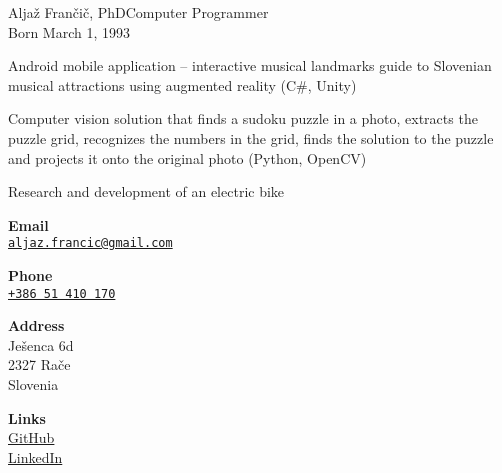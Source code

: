 \documentclass{article}
\begin{document}
\begin{cv}[avatar]{Aljaž Frančič, PhD}{Computer Programmer\\\small{Born March 1, 1993}}
\begin{cvevent}
\end{cvevent}

\cvseparator[2]
\begin{cvevent}
    Android mobile application – interactive musical landmarks guide to Slovenian musical attractions using augmented reality (C\#, Unity)
\end{cvevent}

\cvseparator[2]
\begin{cvevent}
   Computer vision solution that finds a sudoku puzzle in a photo, extracts the puzzle grid, recognizes the numbers in the grid, finds the solution to the puzzle and projects it onto the original photo (Python, OpenCV)
\end{cvevent}

\cvseparator[2]
\begin{cvevent}
    Research and development of an electric bike
\end{cvevent}


\cvsidebar %



\begin{cvitem}[Envelope][4]
    \textbf{Email}\\
    \href{mailto:aljaz.francic@gmail.com}{\texttt{aljaz.francic@gmail.com}}
\end{cvitem}

\cvseparator[3]
\begin{cvitem}[Phone][4]
    \textbf{Phone}\\
    \href{tel:+442071234567}{\texttt{+386 51 410 170}}
\end{cvitem}

\cvseparator[3]
\begin{cvitem}[Home][4]
    \textbf{Address}\\
    Ješenca 6d\\ 2327 Rače \\ Slovenia
\end{cvitem}

\cvseparator[3]
\begin{cvitem}[Globe][4]
     \textbf{Links}\\
     \href{https://github.com/aljazfrancic}{GitHub}\\
     \href{https://www.linkedin.com/in/aljaz-francic}{LinkedIn}
\end{cvitem}



\end{cv}
\end{document}
